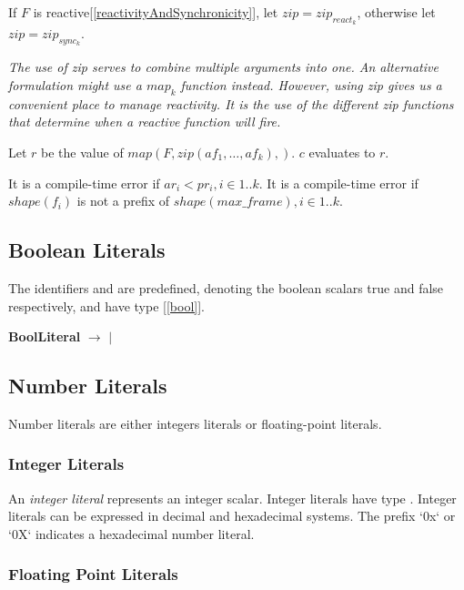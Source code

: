 \documentclass{article}
\begin{document}
If $F$ is reactive[\ref{reactivityAndSynchronicity}], let $zip = zip_{react_k}$, otherwise let $zip = zip_{sync_k}$.

{\em
The use of zip serves to combine multiple arguments into one. An alternative formulation might use a $map_k$ function instead.
However, using zip gives us a convenient place to manage reactivity.
It is the use of the different zip functions that determine when a reactive function will fire. 
}

Let $r$ be the value of $map(F, zip(af_1, \ldots, af_k),)$. $c$ evaluates to $r$.



It is a compile-time error if $ar_i < pr_i, i \in 1..k$. It is a compile-time error if $shape(f_i)$ is not a prefix of $shape(max\_frame), i \in 1..k$. 


\subsection{Boolean Literals}
\label{booleanLiterals}

The identifiers \TRUE{} and \FALSE{} are predefined,  denoting the boolean scalars true and false respectively, and have type \BOOL{} [\ref{bool}].

{\bf BoolLiteral} $\rightarrow$ \TRUE{} $|$ \FALSE{}

\subsection{Number Literals}
\label{numberLiterals}

Number literals are either integers literals or floating-point literals.

\NumberLiteral{}

\subsubsection{Integer Literals}
\label{integerLiterals}

An {\em integer literal} represents an integer scalar.  Integer literals have type \INT{}.
Integer literals can be expressed in decimal and hexadecimal systems. The prefix `0x` or `0X` indicates a hexadecimal number literal. 

\subsubsection{Floating Point Literals}
\label{floatingPointLiterals}
\end{document}
